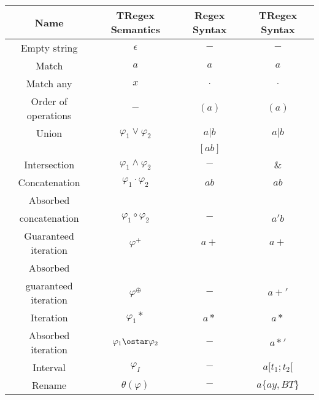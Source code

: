 \begin{tabular}{ |c|c|c|c| }
    \hline
    \textbf{Name} & \textbf{TRegex Semantics} & \textbf{Regex Syntax} & \textbf{TRegex Syntax} \\
    \hline
    Empty string & $\epsilon$ & $-$ & $-$ \\
    \hline
    Match & $a$ & $a$ & $a$ \\
    \hline
    Match any & $x$ & $.$ & $.$ \\
    \hline
    Order of operations & $-$ & $(a)$ & $(a)$ \\
    \hline
    Union & $\varphi_1\vee\varphi_2$ & $a|b$ & $a|b$ \\
    & & $[ab]$ &  \\
    \hline
    Intersection & $\varphi_1\wedge\varphi_2$ & $-$ & $\&$ \\
    \hline
    Concatenation & $\varphi_1\cdot\varphi_2$ & $ab$ & $ab$ \\
    \hline
    Absorbed & & & \\
    concatenation & $\varphi_1\circ\varphi_2$ & $-$ & $a'b$ \\
    \hline
    Guaranteed iteration & $\varphi^+$ & $a+$ & $a+$ \\
    \hline
    Absorbed & & & \\
    guaranteed iteration & $\varphi^\oplus$ & $-$ & $a+'$ \\
    \hline
    Iteration & $\varphi_1*$ & $a*$ & $a*$ \\
    \hline
    Absorbed iteration & $\varphi_1\ostar\varphi_2$ & $-$ & $a*'$ \\
    \hline
    Interval & $\varphi_I$ & $-$ & $a[t_1;t_2[$ \\
    \hline
    Rename & $\theta(\varphi)$ & $-$ & $a\{ay,BT\}$ \\
    \hline
\end{tabular}
\cite*{Eugene2001}\cite*{Masaki2018}